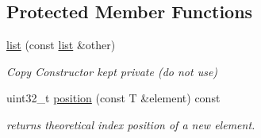 \subsection*{Protected Member Functions}
\begin{DoxyCompactItemize}
\item 
\hyperlink{classcrap_1_1list_a2aca3019f7e393128c40987e33082ecd}{list} (const \hyperlink{classcrap_1_1list}{list} \&other)
\begin{DoxyCompactList}\small\item\em Copy Constructor kept private (do not use) \end{DoxyCompactList}\item 
uint32\+\_\+t \hyperlink{classcrap_1_1list_ac06d4d6001c9e07be8272925d68da033}{position} (const T \&element) const 
\begin{DoxyCompactList}\small\item\em returns theoretical index position of a new element. \end{DoxyCompactList}\end{DoxyCompactItemize}
